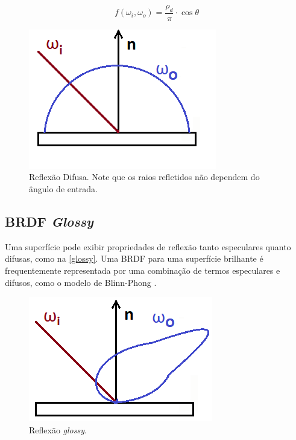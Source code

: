 \documentclass[english,
               brazil,
               bsc] %
               {dcomp-abntex2}
\begin{document}
\begin{equation} \label{eq-diffuse}
f(\omega_i, \omega_o) = \frac{\rho_d}{\pi} \cdot \cos \theta
\end{equation}


\begin{figure}[H]
        \caption{\label{diffuse} \small Reflexão Difusa. Note que os raios refletidos não dependem do ângulo de entrada.}
        \begin{center}
            \includegraphics[scale=0.5]{./Imagens/diffuse-2d.png}
        \end{center}
\end{figure}


\subsection{BRDF \textit{Glossy}}
Uma superfície pode exibir propriedades de reflexão tanto especulares quanto difusas, como na \autoref{glossy}. Uma BRDF para uma superfície brilhante é frequentemente representada por uma combinação de termos especulares e difusos, como o modelo de Blinn-Phong \cite{blinn_phong}.


\begin{figure}[H]
  \caption{\label{glossy} \small Reflexão \textit{glossy}. }
        \begin{center}
            \includegraphics[scale=0.5]{./Imagens/glossy-2d.png}
        \end{center}
\end{figure}
\end{document}
